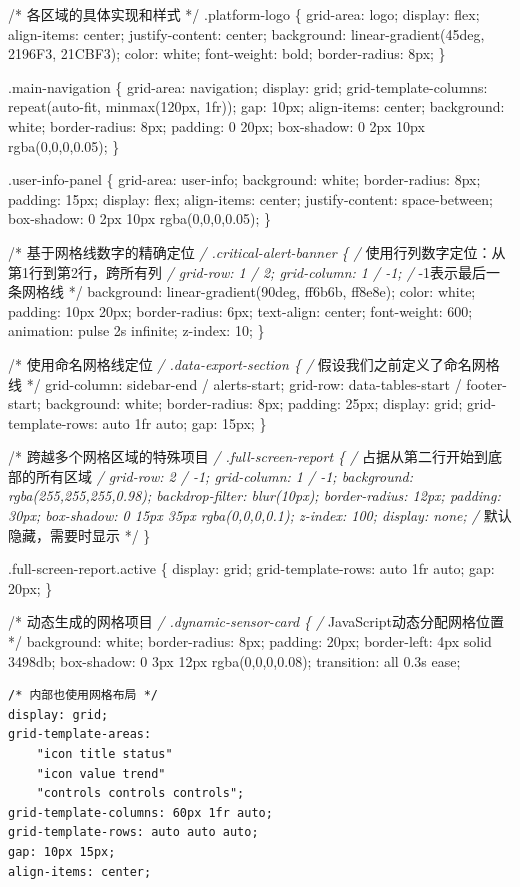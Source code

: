 /* 各区域的具体实现和样式 */ .platform-logo \{ grid-area: logo; display: flex; align-items: center; justify-content: center; background: linear-gradient(45deg, 2196F3, 21CBF3); color: white; font-weight: bold; border-radius: 8px; \}

.main-navigation \{ grid-area: navigation; display: grid; grid-template-columns: repeat(auto-fit, minmax(120px, 1fr)); gap: 10px; align-items: center; background: white; border-radius: 8px; padding: 0 20px; box-shadow: 0 2px 10px rgba(0,0,0,0.05); \}

.user-info-panel \{ grid-area: user-info; background: white; border-radius: 8px; padding: 15px; display: flex; align-items: center; justify-content: space-between; box-shadow: 0 2px 10px rgba(0,0,0,0.05); \}

/* 基于网格线数字的精确定位 \emph{/ .critical-alert-banner \{ /} 使用行列数字定位：从第1行到第2行，跨所有列 \emph{/ grid-row: 1 / 2; grid-column: 1 / -1; /} -1表示最后一条网格线 */ background: linear-gradient(90deg, ff6b6b, ff8e8e); color: white; padding: 10px 20px; border-radius: 6px; text-align: center; font-weight: 600; animation: pulse 2s infinite; z-index: 10; \}

/* 使用命名网格线定位 \emph{/ .data-export-section \{ /} 假设我们之前定义了命名网格线 */ grid-column: sidebar-end / alerts-start; grid-row: data-tables-start / footer-start; background: white; border-radius: 8px; padding: 25px; display: grid; grid-template-rows: auto 1fr auto; gap: 15px; \}

/* 跨越多个网格区域的特殊项目 \emph{/ .full-screen-report \{ /} 占据从第二行开始到底部的所有区域 \emph{/ grid-row: 2 / -1; grid-column: 1 / -1; background: rgba(255,255,255,0.98); backdrop-filter: blur(10px); border-radius: 12px; padding: 30px; box-shadow: 0 15px 35px rgba(0,0,0,0.1); z-index: 100; display: none; /} 默认隐藏，需要时显示 */ \}

.full-screen-report.active \{ display: grid; grid-template-rows: auto 1fr auto; gap: 20px; \}

/* 动态生成的网格项目 \emph{/ .dynamic-sensor-card \{ /} JavaScript动态分配网格位置 */ background: white; border-radius: 8px; padding: 20px; border-left: 4px solid 3498db; box-shadow: 0 3px 12px rgba(0,0,0,0.08); transition: all 0.3s ease;

\begin{verbatim}
/* 内部也使用网格布局 */
display: grid;
grid-template-areas: 
    "icon title status"
    "icon value trend"
    "controls controls controls";
grid-template-columns: 60px 1fr auto;
grid-template-rows: auto auto auto;
gap: 10px 15px;
align-items: center;
\end{verbatim}

